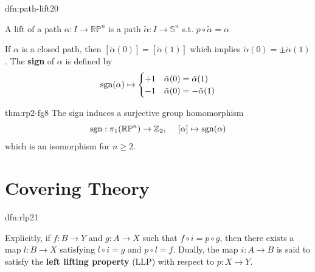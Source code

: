 \documentclass[landscape, 8pt]{extarticle}
\begin{document}
\begin{multicols*}{3}
\vspace{-7pt}
\begin{dfn}{dfn:path-lift}{20}
	\begin{itemize-zero}
	    \item A lift of a path $\alpha : I \to \mathbb{RP}^{n}$ is a path $\tilde{\alpha} : I \to \mathbb{S}^{n}$ s.t. $p \circ \tilde{\alpha} = \alpha$
	    \item If $\alpha$ is a closed path, then $[\tilde{\alpha}(0)] = [\tilde{\alpha}(1)]$ which implies $\tilde{\alpha}(0) = \pm \tilde{\alpha}(1)$. The \textbf{sign} of $\alpha$ is defined by
			\[\operatorname{sgn}(\alpha) \mapsto \begin{cases}
				+1 & \tilde{\alpha}(0) = \tilde{\alpha}(1) \\
				-1 & \tilde{\alpha}(0) = -\tilde{\alpha}(1)
			\end{cases}\]
	\end{itemize-zero}

\end{dfn}

\vspace{-7pt}
\begin{thm}{thm:rp2-fg}{8}
	\vspace{-2pt}
	The sign induces a surjective group homomorphism
	\vspace{-3pt}
	\[\operatorname{sgn} : \pi_{1}(\mathbb{RP}^{n}) \to \mathbb{Z}_{2},\;\quad [\alpha] \mapsto \operatorname{sgn}(\alpha)\]
	which is an isomorphism for $n \ge 2$.
\end{thm}

\section{Covering Theory}
\vspace{-3pt}
\begin{dfn}{dfn:rlp}{21}
	\vspace{-2pt}
	{
	}
Explicitly, if $f : B \to Y$ and $g : A \to X$ such that $f \circ i = p \circ g$, then there exists a map $l : B \to X$ satisfying $l \circ i = g$ and $p \circ l = f$. Dually, the map $i : A \to B$ is said to satisfy the \textbf{left lifting property} (LLP) with respect to $p : X \to Y$.
\end{dfn}


\end{multicols*}
\end{document}

